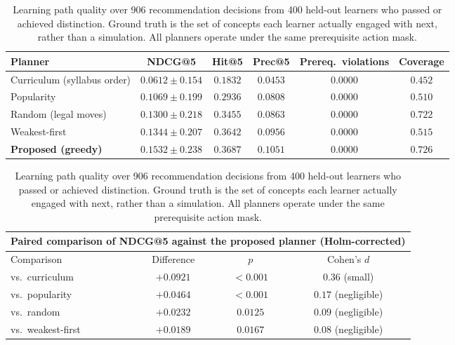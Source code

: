 \begin{table}[t]
\centering
\caption{Learning path quality over 906 recommendation decisions from 400 held-out
learners who passed or achieved distinction. Ground truth is the set of concepts each
learner actually engaged with next, rather than a simulation. All planners operate
under the same prerequisite action mask.}
\label{tab:pathquality}
\begin{tabular}{lccccc}
\toprule
Planner & NDCG@5 & Hit@5 & Prec@5 & Prereq.\ violations & Coverage \\
\midrule
Curriculum (syllabus order) & $0.0612 \pm 0.154$ & $0.1832$ & $0.0453$ & $0.0000$ & $0.452$ \\
Popularity                  & $0.1069 \pm 0.199$ & $0.2936$ & $0.0808$ & $0.0000$ & $0.510$ \\
Random (legal moves)        & $0.1300 \pm 0.218$ & $0.3455$ & $0.0863$ & $0.0000$ & $0.722$ \\
Weakest-first               & $0.1344 \pm 0.207$ & $0.3642$ & $0.0956$ & $0.0000$ & $0.515$ \\
\textbf{Proposed (greedy)}  & $\mathbf{0.1532 \pm 0.238}$ & $\mathbf{0.3687}$ & $\mathbf{0.1051}$ & $\mathbf{0.0000}$ & $\mathbf{0.726}$ \\
\bottomrule
\end{tabular}

\vspace{4pt}
\begin{tabular}{lccc}
\multicolumn{4}{c}{\footnotesize Paired comparison of NDCG@5 against the proposed planner (Holm-corrected)}\\
\toprule
Comparison & Difference & $p$ & Cohen's $d$ \\
\midrule
vs.\ curriculum    & $+0.0921$ & $<0.001$  & $0.36$ (small) \\
vs.\ popularity    & $+0.0464$ & $<0.001$  & $0.17$ (negligible) \\
vs.\ random        & $+0.0232$ & $0.0125$  & $0.09$ (negligible) \\
vs.\ weakest-first & $+0.0189$ & $0.0167$  & $0.08$ (negligible) \\
\bottomrule
\end{tabular}
\end{table}


